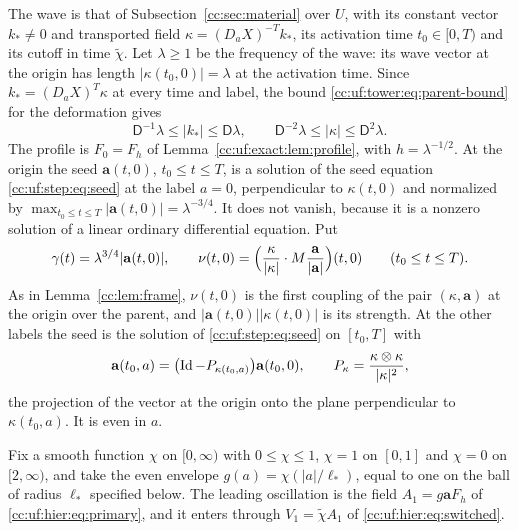 The wave is that of Subsection~\ref{cc:sec:material} over $U$, with its
constant vector $k_*\ne0$ and transported field
$\kappa=(D_aX)^{-T}k_*$, its activation time $t_0\in[0,T)$ and its cutoff
in time $\widetilde\chi$. Let $\lambda\ge1$ be the frequency of the wave:
its wave vector at the origin has length $|\kappa(t_0,0)|=\lambda$ at the
activation time. Since $k_*=(D_aX)^T\kappa$ at every time and label, the
bound \eqref{cc:uf:tower:eq:parent-bound} for the deformation gives
\begin{equation}\label{cc:uf:tower:eq:wave-vector}
 \mathsf D^{-1}\lambda\le|k_*|\le\mathsf D\lambda,\qquad
 \mathsf D^{-2}\lambda\le|\kappa|\le\mathsf D^2\lambda .
\end{equation}
The profile is $F_0=F_h$ of Lemma~\ref{cc:uf:exact:lem:profile}, with
$h=\lambda^{-1/2}$. At the origin the seed $\mathbf a(t,0)$,
$t_0\le t\le T$, is a solution of the seed equation
\eqref{cc:uf:step:eq:seed} at the label $a=0$, perpendicular to
$\kappa(t,0)$ and normalized by
$\max_{t_0\le t\le T}|\mathbf a(t,0)|=\lambda^{-3/4}$. It does not
vanish, because it is a nonzero solution of a linear ordinary
differential equation. Put
\[
 \gamma(t)=\lambda^{3/4}|\mathbf a(t,0)|,\qquad
 \nu(t,0)=\Bigl(\frac{\kappa}{|\kappa|}\cdot
          M\frac{\mathbf a}{|\mathbf a|}\Bigr)(t,0)
 \qquad(t_0\le t\le T).
\]
As in Lemma~\ref{cc:lem:frame}, $\nu(t,0)$ is the first coupling of the
pair $(\kappa,\mathbf a)$ at the origin over the parent, and
$|\mathbf a(t,0)||\kappa(t,0)|$ is its strength. At the other labels
the seed is the solution of \eqref{cc:uf:step:eq:seed} on $[t_0,T]$ with
\begin{equation}\label{cc:uf:tower:eq:start}
 \mathbf a(t_0,a)=\bigl(\operatorname{Id}-P_{\kappa(t_0,a)}\bigr)\mathbf a(t_0,0),
 \qquad P_\kappa=\frac{\kappa\otimes\kappa}{|\kappa|^2},
\end{equation}
the projection of the vector at the origin onto the plane perpendicular
to $\kappa(t_0,a)$. It is even in $a$.

Fix a smooth function $\chi$ on $[0,\infty)$ with $0\le\chi\le1$,
$\chi=1$ on $[0,1]$ and $\chi=0$ on $[2,\infty)$, and take the even
envelope $g(a)=\chi(|a|/\ell_*)$, equal to one on the ball of radius
$\ell_*$ specified below. The leading oscillation is the field
$A_1=g\mathbf aF_h$ of \eqref{cc:uf:hier:eq:primary}, and it enters
through $V_1=\widetilde\chi A_1$ of \eqref{cc:uf:hier:eq:switched}.

